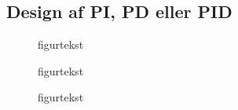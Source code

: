 \subsection{Design af PI, PD eller PID}
\begin{figure}[!th]
\centering
\begin{tikzpicture}[auto, node distance=2.6cm,>=latex']

\end{tikzpicture}
\caption[tekst i indholdsfortegnelsen]{figurtekst}
\label{fig:}
\end{figure}

\begin{figure}[!th]
\centering
\begin{tikzpicture}[auto, node distance=2.6cm,>=latex']

\end{tikzpicture}
\caption[tekst i indholdsfortegnelsen]{figurtekst}
\label{fig:}
\end{figure}

\begin{figure}[!th]
\centering
\begin{tikzpicture}[auto, node distance=2.6cm,>=latex']

\end{tikzpicture}
\caption[tekst i indholdsfortegnelsen]{figurtekst}
\label{fig:}
\end{figure}